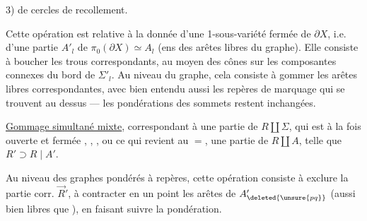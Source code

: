 
3)   de cercles de recollement.

Cette opération est relative à la donnée d'une 1-sous-variété fermée de $\partial X$, i.e. d'une partie $A'_l$ de $\pi_0(\partial X)\simeq A_l$ (ens des arêtes libres du graphe).
Elle consiste à boucher les trous correspondants, au moyen des cônes sur les composantes connexes du bord de $\Sigma'_l$.
Au niveau du graphe, cela consiste à gommer les arêtes libres correspondantes, avec bien entendu aussi les repères de marquage qui se trouvent au dessus ---  les pondérations des sommets restent inchangées.

\uline{Gommage simultané mixte},  correspondant à une partie
   de $R\amalg\Sigma$,
qui est à la fois ouverte et fermée 
,
,
,
ou ce qui revient au $=$, une partie  de $R\amalg A$, telle que $R'\supset R\mid A'$.

Au niveau des graphes pondérés à repères, cette opération consiste à exclure   la partie corr. $\vec R'$, à contracter en un point les arêtes de $A'_{\deleted{\unsure{pq}}}$ (aussi bien libres que ), en faisant suivre la pondération.
